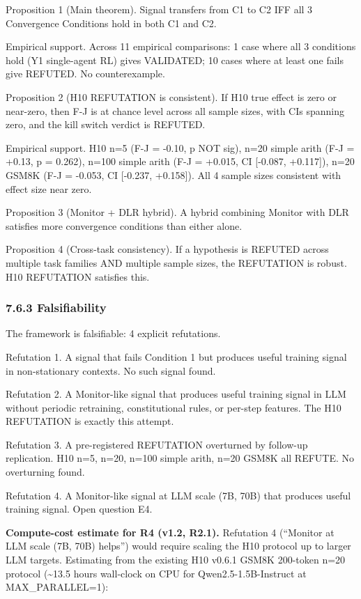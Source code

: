 \documentclass[
]{article}
\begin{document}
Proposition 1 (Main theorem). Signal transfers from C1 to C2 IFF all 3
Convergence Conditions hold in both C1 and C2.

Empirical support. Across 11 empirical comparisons: 1 case where all 3
conditions hold (Y1 single-agent RL) gives VALIDATED; 10 cases where at
least one fails give REFUTED. No counterexample.

Proposition 2 (H10 REFUTATION is consistent). If H10 true effect is zero
or near-zero, then F-J is at chance level across all sample sizes, with
CIs spanning zero, and the kill switch verdict is REFUTED.

Empirical support. H10 n=5 (F-J = -0.10, p NOT sig), n=20 simple arith
(F-J = +0.13, p = 0.262), n=100 simple arith (F-J = +0.015, CI
{[}-0.087, +0.117{]}), n=20 GSM8K (F-J = -0.053, CI {[}-0.237,
+0.158{]}). All 4 sample sizes consistent with effect size near zero.

Proposition 3 (Monitor + DLR hybrid). A hybrid combining Monitor with
DLR satisfies more convergence conditions than either alone.

Proposition 4 (Cross-task consistency). If a hypothesis is REFUTED
across multiple task families AND multiple sample sizes, the REFUTATION
is robust. H10 REFUTATION satisfies this.

\subsubsection{7.6.3 Falsifiability}\label{falsifiability}

The framework is falsifiable: 4 explicit refutations.

Refutation 1. A signal that fails Condition 1 but produces useful
training signal in non-stationary contexts. No such signal found.

Refutation 2. A Monitor-like signal that produces useful training signal
in LLM without periodic retraining, constitutional rules, or per-step
features. The H10 REFUTATION is exactly this attempt.

Refutation 3. A pre-registered REFUTATION overturned by follow-up
replication. H10 n=5, n=20, n=100 simple arith, n=20 GSM8K all REFUTE.
No overturning found.

Refutation 4. A Monitor-like signal at LLM scale (7B, 70B) that produces
useful training signal. Open question E4.

\textbf{Compute-cost estimate for R4 (v1.2, R2.1).} Refutation 4
(``Monitor at LLM scale (7B, 70B) helps'') would require scaling the H10
protocol up to larger LLM targets. Estimating from the existing H10
v0.6.1 GSM8K 200-token n=20 protocol (\textasciitilde13.5 hours
wall-clock on CPU for Qwen2.5-1.5B-Instruct at MAX\_PARALLEL=1):
\end{document}
